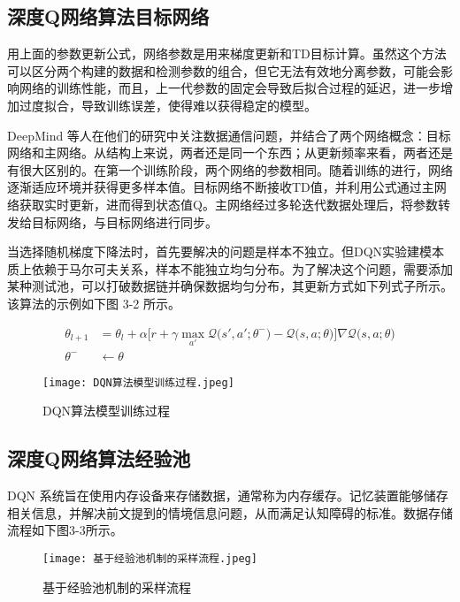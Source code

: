 \subsection{深度Q网络算法目标网络}

用上面的参数更新公式，网络参数是用来梯度更新和TD目标计算。虽然这个方法可以区分两个构建的数据和检测参数的组合，但它无法有效地分离参数，可能会影响网络的训练性能，而且，上一代参数的固定会导致后拟合过程的延迟，进一步增加过度拟合，导致训练误差，使得难以获得稳定的模型。

DeepMind 等人在他们的研究中关注数据通信问题，并结合了两个网络概念：目标网络和主网络。从结构上来说，两者还是同一个东西；从更新频率来看，两者还是有很大区别的。在第一个训练阶段，两个网络的参数相同。随着训练的进行，网络逐渐适应环境并获得更多样本值。目标网络不断接收TD值，并利用公式通过主网络获取实时更新，进而得到状态值Q。主网络经过多轮迭代数据处理后，将参数转发给目标网络，与目标网络进行同步。

当选择随机梯度下降法时，首先要解决的问题是样本不独立。但DQN实验建模本质上依赖于马尔可夫关系，样本不能独立均匀分布。为了解决这个问题，需要添加某种测试池，可以打破数据链并确保数据均匀分布，其更新方式如下列式子所示。该算法的示例如下图 3-2 所示。

\begin{align}
	\theta_{l+1} &= \theta_l + \alpha \bigg[ r + \gamma \max_{a'} \mathcal{Q}\Big(s', a'; \theta^- \Big) - \mathcal{Q}\big(s, a; \theta\big) \bigg] \nabla \mathcal{Q}\big(s, a; \theta\big) \\
	\theta^- &\leftarrow \theta
\end{align}

\begin{figure}[hbt]
	\centering
	\texttt{[image: DQN算法模型训练过程.jpeg]}
	\caption{DQN算法模型训练过程}
	\label{f.example}
\end{figure}

\subsection{深度Q网络算法经验池}

DQN 系统旨在使用内存设备来存储数据，通常称为内存缓存\cite{wawrzynski2013autonomous}。记忆装置能够储存相关信息，并解决前文提到的情境信息问题，从而满足认知障碍的标准。数据存储流程如下图3-3所示。

\begin{figure}[hbt]
	\centering
	\texttt{[image: 基于经验池机制的采样流程.jpeg]}
	\caption{基于经验池机制的采样流程}
	\label{f.example}
\end{figure}


